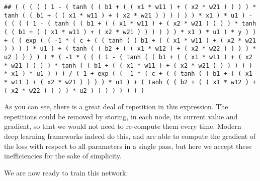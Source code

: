 \documentclass[
  a4paper,
]{article}
\begin{document}
\begin{verbatim}
## ( ( ( ( ( 1 - ( tanh ( ( b1 + ( ( x1 * w11 ) + ( x2 * w21 ) ) ) ) * tanh ( ( b1 + ( ( x1 * w11 ) + ( x2 * w21 ) ) ) ) ) ) * x1 ) * u1 ) - ( ( ( ( 1 - ( tanh ( ( b1 + ( ( x1 * w11 ) + ( x2 * w21 ) ) ) ) * tanh ( ( b1 + ( ( x1 * w11 ) + ( x2 * w21 ) ) ) ) ) ) * x1 ) * u1 ) * y ) ) + ( ( exp ( ( -1 * ( c + ( ( tanh ( ( b1 + ( ( x1 * w11 ) + ( x2 * w21 ) ) ) ) * u1 ) + ( tanh ( ( b2 + ( ( x1 * w12 ) + ( x2 * w22 ) ) ) ) * u2 ) ) ) ) ) * ( -1 * ( ( ( 1 - ( tanh ( ( b1 + ( ( x1 * w11 ) + ( x2 * w21 ) ) ) ) * tanh ( ( b1 + ( ( x1 * w11 ) + ( x2 * w21 ) ) ) ) ) ) * x1 ) * u1 ) ) ) / ( 1 + exp ( ( -1 * ( c + ( ( tanh ( ( b1 + ( ( x1 * w11 ) + ( x2 * w21 ) ) ) ) * u1 ) + ( tanh ( ( b2 + ( ( x1 * w12 ) + ( x2 * w22 ) ) ) ) * u2 ) ) ) ) ) ) ) )
\end{verbatim}

As you can see, there is a great deal of repetition in this expression.
The repetitions could be removed by storing, in each node, its current
value and gradient, so that we would not need to re-compute them every
time. Modern deep learning frameworks indeed do this, and are able to
compute the gradient of the loss with respect to all parameters in a
single pass, but here we accept these inefficiencies for the sake of
simplicity.

We are now ready to train this network:
\end{document}
